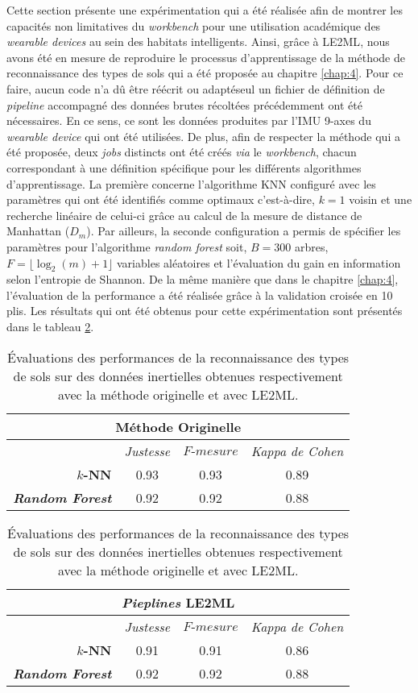 Cette section présente une expérimentation qui a été réalisée afin de montrer les capacités non limitatives du \textit{workbench} pour une utilisation académique des \textit{wearable devices} au sein des habitats intelligents. Ainsi, grâce à \acs{LE2ML}, nous avons été en mesure de reproduire le processus d'apprentissage de la méthode de reconnaissance des types de sols qui a été proposée au chapitre \ref{chap:4}. Pour ce faire, aucun code n'a dû être réécrit ou adapté\textemdash seul un fichier de définition de \textit{pipeline} accompagné des données brutes récoltées précédemment ont été nécessaires. En ce sens, ce sont les données produites par l'\acs{IMU} 9-axes du \textit{wearable device} qui ont été utilisées. De plus, afin de respecter la méthode qui a été proposée, deux \textit{jobs} distincts ont été créés \textit{via} le \textit{workbench}, chacun correspondant à une définition spécifique pour les différents algorithmes d'apprentissage. La première concerne l'algorithme \acs{KNN} configuré avec les paramètres qui ont été identifiés comme optimaux c'est-à-dire, $k=1$ voisin et une recherche linéaire de celui-ci grâce au calcul de la mesure de distance de Manhattan ($D_m$). Par ailleurs, la seconde configuration a permis de spécifier les paramètres pour l'algorithme \textit{random forest} soit, $B=300$ arbres, $F=\lfloor\log_2(m) + 1\rfloor$ variables aléatoires et l'évaluation du gain en information selon l'entropie de Shannon. De la même manière que dans le chapitre \ref{chap:4}, l'évaluation de la performance a été réalisée grâce à la validation croisée en 10 plis. Les résultats qui ont été obtenus pour cette expérimentation sont présentés dans le tableau \ref{tab:results_workbench}.

\begin{table}[H]
  \centering
  \caption{Évaluations des performances de la reconnaissance des types de sols sur des données inertielles obtenues respectivement avec la méthode originelle et avec \acs{LE2ML}.}
  \label{tab:results_workbench}
  \begin{tabular}{@{}rccc@{}}
    \toprule
      \multicolumn{4}{c}{\textbf{Méthode Originelle}} \\
    \midrule
      \multicolumn{1}{l}{} & \textit{Justesse} & $F\mbox{-} mesure$ & \textit{Kappa de Cohen} \\[-10pt]
      \textbf{$k$-NN} & 0.93 & 0.93 & 0.89 \\[-10pt]
      \textbf{\textit{Random Forest}} & 0.92 & 0.92 & 0.88 \\
    \bottomrule
  \end{tabular}
  \begin{tabular}{@{}rccc@{}}
      \multicolumn{4}{c}{\textbf{\textit{Pieplines} \acs{LE2ML}}} \\
    \midrule
      \multicolumn{1}{l}{} & \textit{Justesse} & $F\mbox{-} mesure$ & \textit{Kappa de Cohen} \\[-10pt]
      \textbf{$k$-NN} & 0.91 & 0.91 & 0.86 \\[-10pt]
      \textbf{\textit{Random Forest}} & 0.92 & 0.92 & 0.88 \\
    \bottomrule
  \end{tabular}
\end{table}

